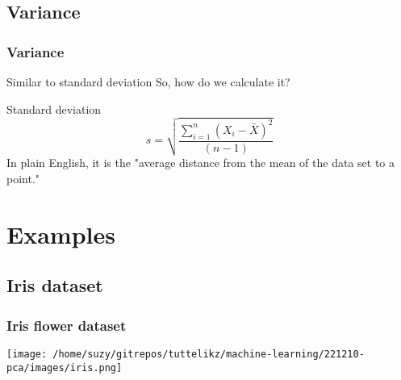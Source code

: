 \documentclass{beamer}
\begin{document}
    \subsection{Variance}
    \begin{frame}
        \frametitle{Variance}
        Similar to standard deviation
        \bigskip
        So, how do we calculate it?
        \begin{center}    
            \begin{block}{Standard deviation}
                \begin{equation}    %
                    s = \sqrt{\frac{\sum_{i=1}^n (X_i - \bar{X})^2}{(n-1)}}
                \end{equation}
                In plain English, it is the "average distance from the mean of the data set to a point."
            \end{block}
        \end{center}
        
    \end{frame}


    \section{Examples}
    \subsection{Iris dataset}
    \begin{frame}
        \frametitle{Iris flower dataset}
        \begin{center}
        \texttt{[image: /home/suzy/gitrepos/tuttelikz/machine-learning/221210-pca/images/iris.png]}
        \end{center}
    \end{frame}
\end{document}
